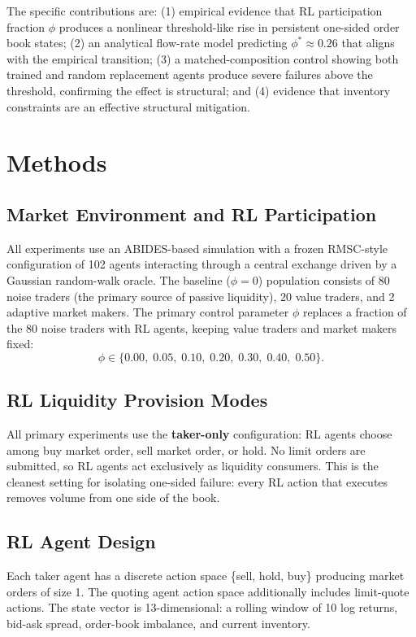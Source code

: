 \documentclass[sigconf]{acmart}
\begin{document}
The specific contributions are: (1) empirical evidence that RL participation fraction $\phi$ produces a nonlinear threshold-like rise in persistent one-sided order book states; (2) an analytical flow-rate model predicting $\phi^* \approx 0.26$ that aligns with the empirical transition; (3) a matched-composition control showing both trained and random replacement agents produce severe failures above the threshold, confirming the effect is structural; and (4) evidence that inventory constraints are an effective structural mitigation.

\section{Methods}

\subsection{Market Environment and RL Participation}

All experiments use an ABIDES-based simulation \cite{byrd2020} with a frozen RMSC-style configuration of 102 agents interacting through a central exchange driven by a Gaussian random-walk oracle. The baseline ($\phi=0$) population consists of 80 noise traders (the primary source of passive liquidity), 20 value traders, and 2 adaptive market makers. The primary control parameter $\phi$ replaces a fraction of the 80 noise traders with RL agents, keeping value traders and market makers fixed:
\[
\phi \in \{0.00,\; 0.05,\; 0.10,\; 0.20,\; 0.30,\; 0.40,\; 0.50\}.
\]

\subsection{RL Liquidity Provision Modes}

All primary experiments use the \textbf{taker-only} configuration: RL agents choose among buy market order, sell market order, or hold. No limit orders are submitted, so RL agents act exclusively as liquidity consumers. This is the cleanest setting for isolating one-sided failure: every RL action that executes removes volume from one side of the book.

\subsection{RL Agent Design}

Each taker agent has a discrete action space \{sell, hold, buy\} producing market orders of size 1. The quoting agent action space additionally includes limit-quote actions. The state vector is 13-dimensional: a rolling window of 10 log returns, bid-ask spread, order-book imbalance, and current inventory.
\end{document}

